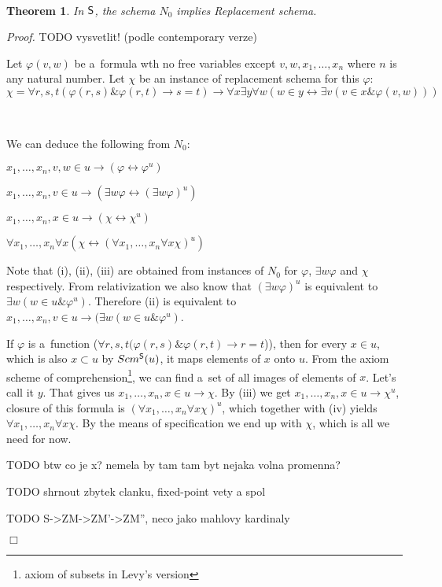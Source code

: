 \documentclass[12pt,a4paper]{article}
\newtheorem{theorem}{Theorem}[section]
\newenvironment{proof}
{\noindent \textit{Proof.}}
{\hspace*{\fill} $\Box$}
\renewcommand{\iff}{\leftrightarrow}
\newcommand{\then}{\rightarrow}
\newcommand{\bce}{\begin{compactenum}}
\newcommand{\ece}{\end{compactenum}}
\begin{document}
\

\begin{theorem}
In $\sf{S}$, the schema $N_0$ implies Replacement schema.
\end{theorem}

\begin{proof}
TODO vysvetlit! (podle contemporary verze)

Let $\varphi(v, w)$ be a~formula wth no free variables except $v, w, x_1, \ldots, x_n$ where $n$ is any natural number.
Let $\chi$ be an instance of replacement schema for this $\varphi$:
\begin{equation}
\chi = \forall r, s, t(\varphi(r, s) \& \varphi(r, t) \then s = t) \then \forall x \exists y \forall w (w \in y \iff \exists v (v \in x \& \varphi(v, w)))
\end{equation}

\

We can deduce the following from $N_0$: 
\bce[(i)]
\item $x_1, \ldots, x_n, v, w \in u \then (\varphi \iff \varphi^{u}) $
\item $x_1, \ldots, x_n, v \in u \then (\exists w \varphi \iff (\exists w \varphi)^{u})$
\item $x_1, \ldots, x_n, x \in u \then (\chi \iff \chi^{u})$
\item $\forall x_1, \ldots, x_n \forall x (\chi \iff (\forall x_1, \ldots, x_n \forall x \chi)^{u})$
\ece

Note that (i), (ii), (iii) are obtained from instances of $N_0$ for $\varphi$, $\exists w \varphi$ and $\chi$ respectively.  %
From relativization we also know that $(\exists w \varphi)^{u}$ is equivalent to $\exists w (w \in u \& \varphi^{u})$.
Therefore (ii) is equivalent to $x_1, \ldots, x_n, v \in u \then (\exists w (w \in u \& \varphi^{u})$. 

If $\varphi$ is a~function ($ \forall r, s, t(\varphi(r, s) \& \varphi(r, t) \then r=t $)), then for every $x \in u$, which is also $x \subset u$ by $Scm^{\sf{S}}(u)$,
it maps elements of $x$ onto $u$. From the axiom scheme of comprehension\footnote{axiom of subsets in Levy's version}, we can find a~set of all images of elements of $x$. Let's call it $y$.
That gives us $x_1, \ldots, x_n, x \in u \then \chi$. By (iii) we get $x_1, \ldots, x_n, x \in u \then \chi^{u}$, closure of this formula is $(\forall x_1, \ldots, x_n \forall x \chi)^{u}$, 
which together with (iv) yields $\forall x_1, \ldots, x_n \forall x \chi$. By the means of specification we end up with $\chi$, which is all we need for now. 


TODO btw co je x? nemela by tam tam byt nejaka volna promenna?

TODO shrnout zbytek clanku, fixed-point vety a spol

TODO S->ZM->ZM'->ZM'', neco jako mahlovy kardinaly

\end{proof}
\end{document}
